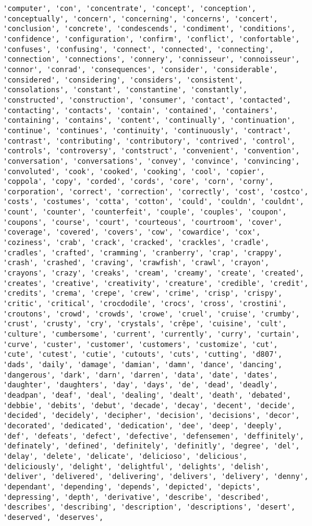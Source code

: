 \documentclass[11pt]{article}
\begin{document}
\begin{Verbatim}[commandchars=\\\{\}]
'computer', 'con', 'concentrate', 'concept', 'conception', 'conceptually', 'concern', 'concerning', 'concerns', 'concert', 'conclusion', 'concrete', 'condescends', 'condiment', 'conditions', 'confidence', 'configuration', 'confirm', 'conflict', 'confortable', 'confuses', 'confusing', 'connect', 'connected', 'connecting', 'connection', 'connections', 'connery', 'connisseur', 'connoisseur', 'connor', 'conrad', 'consequences', 'consider', 'considerable', 'considered', 'considering', 'considers', 'consistent', 'consolations', 'constant', 'constantine', 'constantly', 'constructed', 'construction', 'consumer', 'contact', 'contacted', 'contacting', 'contacts', 'contain', 'contained', 'containers', 'containing', 'contains', 'content', 'continually', 'continuation', 'continue', 'continues', 'continuity', 'continuously', 'contract', 'contrast', 'contributing', 'contributory', 'contrived', 'control', 'controls', 'controversy', 'contstruct', 'convenient', 'convention', 'conversation', 'conversations', 'convey', 'convince', 'convincing', 'convoluted', 'cook', 'cooked', 'cooking', 'cool', 'copier', 'coppola', 'copy', 'corded', 'cords', 'core', 'corn', 'corny', 'corporation', 'correct', 'correction', 'correctly', 'cost', 'costco', 'costs', 'costumes', 'cotta', 'cotton', 'could', 'couldn', 'couldnt', 'count', 'counter', 'counterfeit', 'couple', 'couples', 'coupon', 'coupons', 'course', 'court', 'courteous', 'courtroom', 'cover', 'coverage', 'covered', 'covers', 'cow', 'cowardice', 'cox', 'coziness', 'crab', 'crack', 'cracked', 'crackles', 'cradle', 'cradles', 'crafted', 'cramming', 'cranberry', 'crap', 'crappy', 'crash', 'crashed', 'craving', 'crawfish', 'crawl', 'crayon', 'crayons', 'crazy', 'creaks', 'cream', 'creamy', 'create', 'created', 'creates', 'creative', 'creativity', 'creature', 'credible', 'credit', 'credits', 'crema', 'crepe', 'crew', 'crime', 'crisp', 'crispy', 'critic', 'critical', 'crocdodile', 'crocs', 'cross', 'crostini', 'croutons', 'crowd', 'crowds', 'crowe', 'cruel', 'cruise', 'crumby', 'crust', 'crusty', 'cry', 'crystals', 'crêpe', 'cuisine', 'cult', 'culture', 'cumbersome', 'current', 'currently', 'curry', 'curtain', 'curve', 'custer', 'customer', 'customers', 'customize', 'cut', 'cute', 'cutest', 'cutie', 'cutouts', 'cuts', 'cutting', 'd807', 'dads', 'daily', 'damage', 'damian', 'damn', 'dance', 'dancing', 'dangerous', 'dark', 'darn', 'darren', 'data', 'date', 'dates', 'daughter', 'daughters', 'day', 'days', 'de', 'dead', 'deadly', 'deadpan', 'deaf', 'deal', 'dealing', 'dealt', 'death', 'debated', 'debbie', 'debits', 'debut', 'decade', 'decay', 'decent', 'decide', 'decided', 'decidely', 'decipher', 'decision', 'decisions', 'decor', 'decorated', 'dedicated', 'dedication', 'dee', 'deep', 'deeply', 'def', 'defeats', 'defect', 'defective', 'defensemen', 'deffinitely', 'definately', 'defined', 'definitely', 'definitly', 'degree', 'del', 'delay', 'delete', 'delicate', 'delicioso', 'delicious', 'deliciously', 'delight', 'delightful', 'delights', 'delish', 'deliver', 'delivered', 'delivering', 'delivers', 'delivery', 'denny', 'dependant', 'depending', 'depends', 'depicted', 'depicts', 'depressing', 'depth', 'derivative', 'describe', 'described', 'describes', 'describing', 'description', 'descriptions', 'desert', 'deserved', 'deserves', 
\end{Verbatim}
\end{document}
